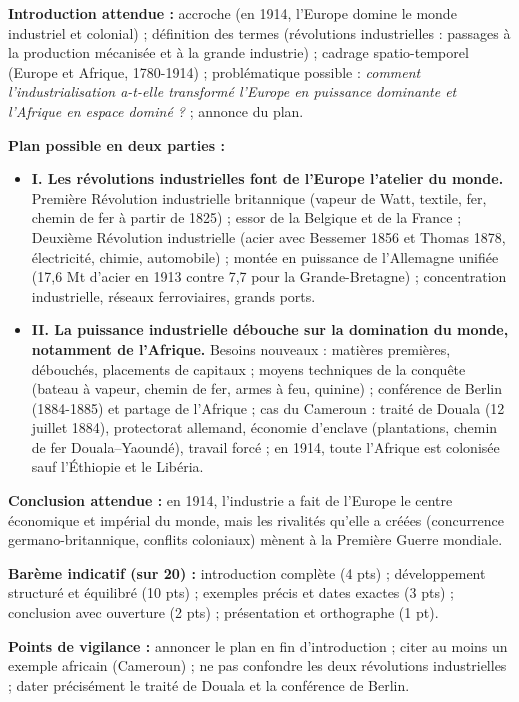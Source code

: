 \documentclass[11pt]{article}
\begin{document}
\begin{corrige}
\textbf{Introduction attendue :} accroche (en 1914, l'Europe domine le monde industriel et colonial) ; définition des termes (révolutions industrielles : passages à la production mécanisée et à la grande industrie) ; cadrage spatio-temporel (Europe et Afrique, 1780-1914) ; problématique possible : \emph{comment l'industrialisation a-t-elle transformé l'Europe en puissance dominante et l'Afrique en espace dominé ?} ; annonce du plan.
\par\medskip
\textbf{Plan possible en deux parties :}
\begin{itemize}
\item \textbf{I. Les révolutions industrielles font de l'Europe l'atelier du monde.} Première Révolution industrielle britannique (vapeur de Watt, textile, fer, chemin de fer à partir de 1825) ; essor de la Belgique et de la France ; Deuxième Révolution industrielle (acier avec Bessemer 1856 et Thomas 1878, électricité, chimie, automobile) ; montée en puissance de l'Allemagne unifiée (17,6 Mt d'acier en 1913 contre 7,7 pour la Grande-Bretagne) ; concentration industrielle, réseaux ferroviaires, grands ports.
\item \textbf{II. La puissance industrielle débouche sur la domination du monde, notamment de l'Afrique.} Besoins nouveaux : matières premières, débouchés, placements de capitaux ; moyens techniques de la conquête (bateau à vapeur, chemin de fer, armes à feu, quinine) ; conférence de Berlin (1884-1885) et partage de l'Afrique ; cas du Cameroun : traité de Douala (12 juillet 1884), protectorat allemand, économie d'enclave (plantations, chemin de fer Douala--Yaoundé), travail forcé ; en 1914, toute l'Afrique est colonisée sauf l'Éthiopie et le Libéria.
\end{itemize}
\textbf{Conclusion attendue :} en 1914, l'industrie a fait de l'Europe le centre économique et impérial du monde, mais les rivalités qu'elle a créées (concurrence germano-britannique, conflits coloniaux) mènent à la Première Guerre mondiale.
\par\medskip
\textbf{Barème indicatif (sur 20) :} introduction complète (4 pts) ; développement structuré et équilibré (10 pts) ; exemples précis et dates exactes (3 pts) ; conclusion avec ouverture (2 pts) ; présentation et orthographe (1 pt).
\par\medskip
\textbf{Points de vigilance :} annoncer le plan en fin d'introduction ; citer au moins un exemple africain (Cameroun) ; ne pas confondre les deux révolutions industrielles ; dater précisément le traité de Douala et la conférence de Berlin.
\end{corrige}
\end{document}
